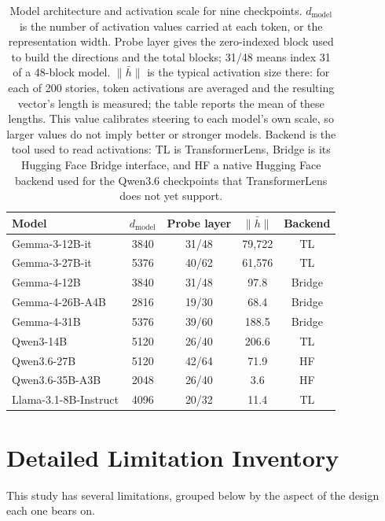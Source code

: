 \documentclass[twocolumn]{article}
\newcommand{\tabledir}{../../results/tables}
\begin{document}
\begin{appendices}
\begin{table}[htbp]
\centering
\footnotesize
\captionsetup{font=footnotesize}
\setlength{\tabcolsep}{3pt}
\begin{tabular}{lcccc}
\toprule
Model & $d_\mathrm{model}$ & Probe layer & $\bar{\|h\|}$ & Backend \\
\midrule
Gemma-3-12B-it          & 3840 & 31/48 & 79{,}722 & TL     \\
Gemma-3-27B-it          & 5376 & 40/62 & 61{,}576 & TL     \\
Gemma-4-12B             & 3840 & 31/48 & 97.8     & Bridge \\
Gemma-4-26B-A4B         & 2816 & 19/30 & 68.4     & Bridge \\
Gemma-4-31B             & 5376 & 39/60 & 188.5    & Bridge \\
\addlinespace
Qwen3-14B               & 5120 & 26/40 & 206.6    & TL     \\
Qwen3.6-27B             & 5120 & 42/64 & 71.9     & HF     \\
Qwen3.6-35B-A3B         & 2048 & 26/40 & 3.6      & HF     \\
\addlinespace
Llama-3.1-8B-Instruct   & 4096 & 20/32 & 11.4     & TL     \\
\bottomrule
\end{tabular}
\caption{%
  Model architecture and activation scale for nine checkpoints.
  $d_\mathrm{model}$ is the number of activation values carried at each token,
  or the representation width. Probe layer gives the zero-indexed block used
  to build the directions and the total blocks; 31/48 means index 31 of a
  48-block model. $\bar{\|h\|}$ is the typical activation size there: for each
  of 200 stories, token activations are averaged and the resulting vector's
  length is measured; the table reports the mean of these lengths. This value
  calibrates steering to each model's own scale, so larger values do not imply
  better or stronger models. Backend is the tool used to read activations: TL
  is TransformerLens, Bridge is its Hugging Face Bridge interface, and HF a
  native Hugging Face backend used for the Qwen3.6 checkpoints that
  TransformerLens does not yet support.
}
\label{tab:models}
\end{table}


\clearpage

\section*{Detailed Limitation Inventory}
\label{appx:detailed_limitations}
This study has several limitations, grouped below by the aspect of the
design each one bears on.


\end{appendices}
\end{document}
